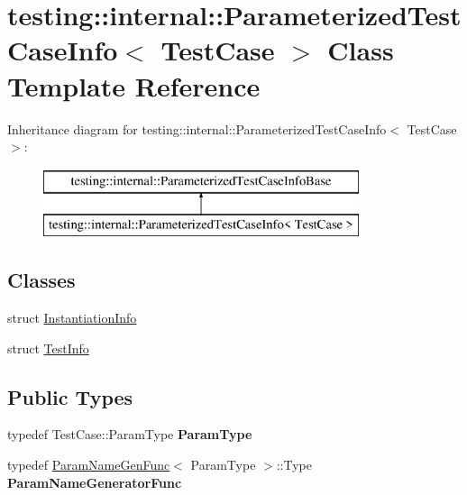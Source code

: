 \hypertarget{classtesting_1_1internal_1_1_parameterized_test_case_info}{}\section{testing\+:\+:internal\+:\+:Parameterized\+Test\+Case\+Info$<$ Test\+Case $>$ Class Template Reference}
\label{classtesting_1_1internal_1_1_parameterized_test_case_info}
Inheritance diagram for testing\+:\+:internal\+:\+:Parameterized\+Test\+Case\+Info$<$ Test\+Case $>$\+:\begin{figure}[H]
\begin{center}
\leavevmode
\includegraphics[height=2.000000cm]{classtesting_1_1internal_1_1_parameterized_test_case_info}
\end{center}
\end{figure}
\subsection*{Classes}
\begin{DoxyCompactItemize}
\item 
struct \mbox{\hyperlink{structtesting_1_1internal_1_1_parameterized_test_case_info_1_1_instantiation_info}{Instantiation\+Info}}
\item 
struct \mbox{\hyperlink{structtesting_1_1internal_1_1_parameterized_test_case_info_1_1_test_info}{Test\+Info}}
\end{DoxyCompactItemize}
\subsection*{Public Types}
\begin{DoxyCompactItemize}
\item 
\mbox{\label{classtesting_1_1internal_1_1_parameterized_test_case_info_a643a87e178bf92a4246ce21054e44b96}} 
typedef Test\+Case\+::\+Param\+Type {\bfseries Param\+Type}
\item 
\mbox{\label{classtesting_1_1internal_1_1_parameterized_test_case_info_aed6c5184cb8f94cec73e9d7c4b7fa2ce}} 
typedef \mbox{\hyperlink{structtesting_1_1internal_1_1_param_name_gen_func}{Param\+Name\+Gen\+Func}}$<$ Param\+Type $>$\+::Type {\bfseries Param\+Name\+Generator\+Func}
\end{DoxyCompactItemize}
